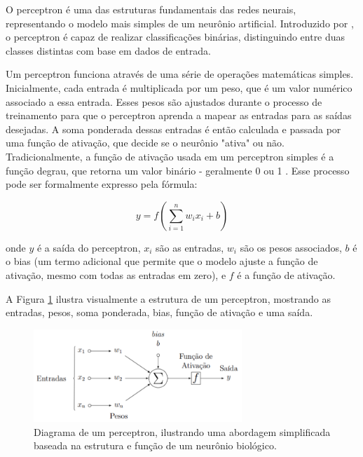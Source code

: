 
O perceptron é uma das estruturas fundamentais das redes neurais, representando o modelo mais simples de um neurônio artificial. Introduzido por , o perceptron é capaz de realizar classificações binárias, distinguindo entre duas classes distintas com base em dados de entrada.

Um perceptron funciona através de uma série de operações matemáticas simples. Inicialmente, cada entrada é multiplicada por um peso, que é um valor numérico associado a essa entrada. Esses pesos são ajustados durante o processo de treinamento para que o perceptron aprenda a mapear as entradas para as saídas desejadas. A soma ponderada dessas entradas é então calculada e passada por uma função de ativação, que decide se o neurônio "ativa" ou não. Tradicionalmente, a função de ativação usada em um perceptron simples é a função degrau, que retorna um valor binário - geralmente 0 ou 1 \cite{hertz2018introduction}. Esse processo pode ser formalmente expresso pela fórmula:

\[
y = f\left(\sum_{i=1}^{n} w_i x_i + b\right)
\]

onde $y$ é a saída do perceptron, $x_i$ são as entradas, $w_i$ são os pesos associados, $b$ é o bias (um termo adicional que permite que o modelo ajuste a função de ativação, mesmo com todas as entradas em zero), e $f$ é a função de ativação.

A Figura \ref{fig:perceptron} ilustra visualmente a estrutura de um perceptron, mostrando as entradas, pesos, soma ponderada, bias, função de ativação e uma saída.

\begin{figure}
    \centering   
    \includegraphics[width=0.7\textwidth]{fig/perceptron.png}
    \caption{Diagrama de um perceptron, ilustrando uma abordagem simplificada baseada na estrutura e função de um neurônio biológico.}
    \label{fig:perceptron}
\end{figure}

